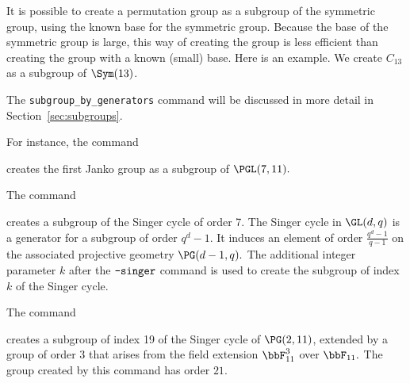 \bigskip



It is possible to create a permutation group as a subgroup of the symmetric group, 
using the known base for the symmetric group.
Because the base of the symmetric group is large, 
this way of creating the group 
is less efficient than creating the group with a known (small) base.
Here is an example. We create $C_{13}$ as a subgroup of $\Sym(13)$.
{\tt

}
The \verb'subgroup_by_generators' command will be discussed in more detail in Section~\ref{sec:subgroups}.

\bigskip




For instance, the command
{\tt

}
creates the first Janko group as a subgroup of $\PGL(7,11).$ 

\bigskip

The command 
{\tt

}
creates a subgroup of the Singer cycle of order 7.
The Singer cycle in $\GL(d,q)$ is a generator for a subgroup of order $q^d-1$. 
It induces an element of order  $\frac{q^d-1}{q-1}$ on the associated projective geometry $\PG(d-1,q).$
The additional integer parameter $k$ after the $\verb'-singer'$ command  is used to 
create  the subgroup of index $k$ of the Singer cycle.

\bigskip


The command 
{\tt

}
creates a subgroup of index 19 of the Singer cycle of $\PG(2,11)$, 
extended by a group of order $3$ 
that arises from the field extension $\bbF_{11}^3$ over $\bbF_{11}.$ 
The group created by this command has order $21$.


\bigskip




